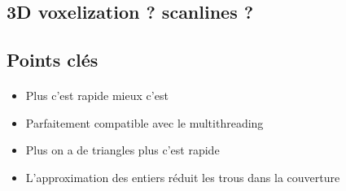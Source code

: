 \subsection{3D voxelization ? scanlines ?}

\begin{frame}[fragile=singleslide]{\insertsectionhead}
  \framesubtitle{\insertsubsectionhead}
  \begin{figure}
      \begin{subfigure}{1\textwidth}
      \end{subfigure}
    \end{figure}
\end{frame}

\subsection{Points clés}

\begin{frame}[fragile=singleslide]{\insertsectionhead}
  \framesubtitle{\insertsubsectionhead}
  \begin{itemize}
      \item Plus c'est rapide mieux c'est
      \item Parfaitement compatible avec le multithreading
      \item Plus on a de triangles plus c'est rapide
      \item L'approximation des entiers réduit les trous dans la couverture
    \end{itemize}
    \vspace{0.5cm}
    \begin{figure}
      \begin{subfigure}{1\textwidth}
      \end{subfigure}
    \end{figure}
    
    
\end{frame}

